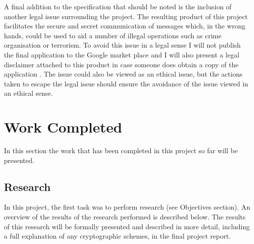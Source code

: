 \documentclass[a4paper,11pt]{article}
\begin{document}
A final addition to the specification that should be noted is the inclusion of another legal issue surrounding the project. The resulting product of this project facilitates the secure and secret communication of messages which, in the wrong hands, could be used to aid a number of illegal operations such as crime organisation or terrorism. To avoid this issue in a legal sense I will not publish the final application to the Google market place and I will also present a legal disclaimer attached to this product in case someone does obtain a copy of the application \cite{dataprotect}. The issue could also be viewed as an ethical issue, but the actions taken to escape the legal issue should ensure the avoidance of the issue viewed in an ethical sense. 

\section{Work Completed}

In this section the work that has been completed in this project so far will be presented.

\subsection{Research}

In this project, the first task was to perform research (see Objectives section). An overview of the results of the research performed is described below. The results of this research will be formally presented and described in more detail, including a full explanation of any cryptographic schemes, in the final project report.
\end{document}

